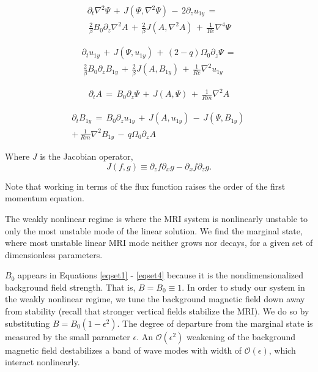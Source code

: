 \documentclass{emulateapj}
\newcommand{\beq}{\begin{equation}}
\newcommand{\eeq}{\end{equation}}
\newcommand\reye{\mathrel{Re}}
\newcommand\reym{\mathrel{Rm}}
\begin{document}
\begin{multline}
\label{eqset1}
\partial_t \nabla^2 \Psi \, + \, J\left(\Psi, \nabla^2 \Psi\right) \, - \, 2 \partial_z u_{1y} \, = \\
\, \frac{2}{\beta} B_0 \partial_z \nabla^2 A \, + \, \frac{2}{\beta}J\left(A, \nabla^2 A \right) \, + \, \frac{1}{\reye}\nabla^4 \Psi
\end{multline}

\begin{multline}
\label{eqset2}
\partial_t u_{1y} \, + \, J\left(\Psi, u_{1y}\right) \, + \, \left(2 - q\right) \Omega_0 \partial_z \Psi \, = \\
\, \frac{2}{\beta}B_0\partial_z B_{1y} \, + \, \frac{2}{\beta} J\left(A, B_{1y}\right) \, + \, \frac{1}{\reye} \nabla^2 u_{1y}
\end{multline}

\begin{multline}
\label{eqset3}
\partial_t A \, = \, B_0 \partial_z \Psi \, + \, J\left(A, \Psi\right) \, + \, \frac{1}{\reym} \nabla^2 A
\end{multline}

\begin{multline}
\label{eqset4}
\partial_t B_{1y} \, = \, B_0 \partial_z u_{1y} \, + \, J\left(A, u_{1y}\right) \, - \, J\left(\Psi, B_{1y}\right) \, \\
+ \, \frac{1}{\reym} \nabla^2 B_{1y}  \, - \, q \Omega_0 \partial_z A
\end{multline}

Where $J$ is the Jacobian operator, 
\beq
J\left(f, g\right) \equiv \partial_z f\partial_x g - \partial_x f \partial_z g.
\eeq  

Note that working in terms of the flux function raises the order of the first momentum equation.

The weakly nonlinear regime is where the MRI system is nonlinearly unstable to only the most unstable mode of the linear solution. We find the marginal state, where most unstable linear MRI mode neither grows nor decays, for a given set of dimensionless parameters. 

$B_0$ appears in Equations \ref{eqset1} - \ref{eqset4} because it is the nondimensionalized background field strength. That is, $B = B_0 \equiv 1$. In order to study our system in the weakly nonlinear regime, we tune the background magnetic field down away from stability (recall that stronger vertical fields stabilize the MRI). We do so by substituting $B = B_0\left(1 - \epsilon^2\right)$. The degree of departure from the marginal state is measured by the small parameter $\epsilon$. An $\mathcal{O}\left(\epsilon^2\right)$ weakening of the background magnetic field destabilizes a band of wave modes with width of $\mathcal{O}\left(\epsilon\right)$, which interact nonlinearly.
\end{document}
